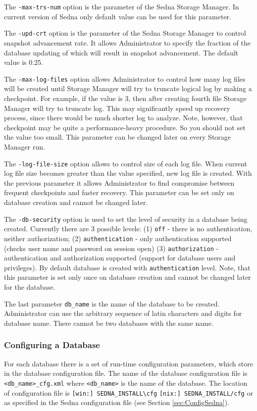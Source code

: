 \documentclass[a4paper,12pt]{article}
\begin{document}
The \verb!-max-trs-num! option is the parameter of the Sedna Storage Manager. In current version of Sedna only default value can be used for this parameter.

The \verb!-upd-crt! option is the parameter of the Sedna Storage Manager to control snapshot advancement rate. It allows Administrator to specify the fraction of the database updating of which will result in snapshot advancement. The default value is 0.25.

The \verb!-max-log-files! option allows Administrator to control how many log files will be created until Storage Manager will try
to truncate logical log by making a checkpoint. For example, if the value is $3$, then after creating fourth file Storage Manager will try to truncate log. This may significantly speed up recovery process, since there would be much shorter log to analyze. Note, however, that checkpoint may be quite a performance-heavy procedure. So you should not set the value too small. This parameter can be changed later on every Storage Manager run.

The \verb!-log-file-size! option allows to control size of each log file. When current log file size becomes greater than the value specified, new log file is created. With the previous parameter it allows Administrator to find compromise between frequent checkpoints and faster recovery. This parameter can be set only on database creation and cannot be changed later.

The \verb!-db-security! option is used to set the level of security in a database being created. Currently there are 3 possible levels: (1) \verb!off! - there is no authentication, neither authorization; (2) \verb!authentication! - only authentication supported (checks user name and password on session open) (3) \verb!authorization! - authentication and authorization supported (support for database users and privileges). By default database is created with \verb!authentication! level. Note, that this parameter is set only once on database creation and cannot be changed later for the database.

The last parameter \verb!db_name! is the name of the database to be created. Administrator can use the arbitrary sequence of latin characters and digits for database name. There  cannot be two databases with the same name.

\subsubsection{Configuring a Database}
\label{ConfigDB}
For each database there is a set of run-time configuration parameters, which store in the database configuration file. The name of the database configuration file is \verb!<db_name>_cfg.xml! where \verb!<db_name>! is the name of the database. The location of configuration file is \verb![win:] SEDNA_INSTALL\cfg! \verb![nix:] SEDNA_INSTALL/cfg! or as specified in the Sedna configuration file (see Section \ref{sec:ConfigSedna}).
\end{document}

